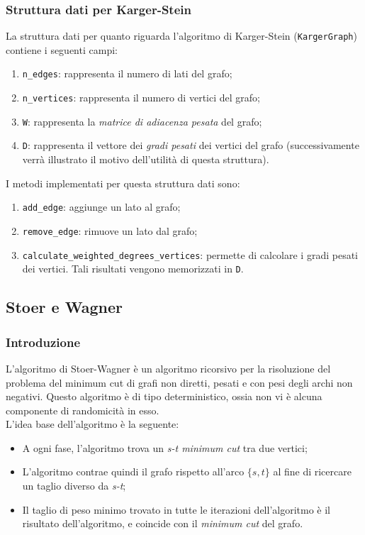 \subsubsection{Struttura dati per Karger-Stein}
\label{struttura_dati_karger_stein}
La struttura dati per quanto riguarda l'algoritmo di Karger-Stein (\verb|KargerGraph|) contiene i seguenti campi:
\begin{enumerate}
  \item \verb|n_edges|: rappresenta il numero di lati del grafo;
  \item \verb|n_vertices|: rappresenta il numero di vertici del grafo;
  \item \verb|W|: rappresenta la \textit{matrice di adiacenza pesata} del grafo;
  \item \verb|D|: rappresenta il vettore dei \textit{gradi pesati} dei vertici del grafo (successivamente verrà illustrato 
  il motivo dell'utilità di questa struttura).
\end{enumerate}

\noindent I metodi implementati per questa struttura dati sono:
\begin{enumerate}
  \item \verb|add_edge|: aggiunge un lato al grafo;
  \item \verb|remove_edge|: rimuove un lato dal grafo;
  \item \label{calculate_weighted_degrees_vertices} \verb|calculate_weighted_degrees_vertices|: permette di calcolare i gradi pesati dei vertici. Tali risultati vengono 
  memorizzati in \verb|D|.
\end{enumerate}

\subsection{Stoer e Wagner}

\subsubsection{Introduzione}

L'algoritmo di Stoer-Wagner è un algoritmo ricorsivo per la risoluzione del problema del minimum cut di grafi non diretti, pesati e con pesi degli archi non negativi. Questo algoritmo è di tipo deterministico, ossia non vi è alcuna componente di randomicità in esso. \\
L'idea base dell'algoritmo è la seguente: 
\begin{itemize}
  \item A ogni fase, l'algoritmo trova un \textit{s-t minimum cut} tra due vertici;
  \item L'algoritmo contrae quindi il grafo rispetto all'arco $\{s,t\}$ al fine di ricercare un taglio diverso da \textit{s-t};
  \item Il taglio di peso minimo trovato in tutte le iterazioni dell'algoritmo è il risultato dell'algoritmo, e coincide con il \textit{minimum cut} del grafo.
\end{itemize}


